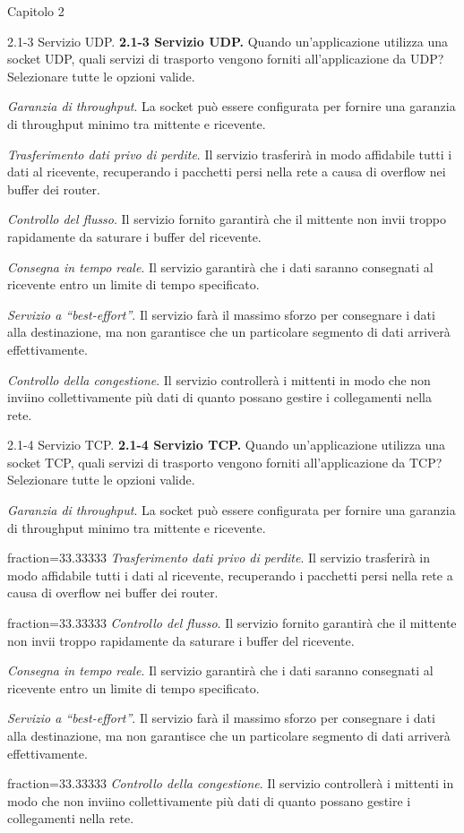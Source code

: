 \documentclass[11pt]{article}
\begin{document}
\begin{quiz}{Capitolo 2}
\begin{multi}[points=1,shuffle,multiple]{2.1-3 Servizio UDP.}
\textbf{2.1-3 Servizio UDP.} Quando un'applicazione utilizza una socket UDP, quali servizi di trasporto vengono forniti all'applicazione da UDP? Selezionare tutte le opzioni valide.
\item \emph{Garanzia di throughput}. La socket può essere configurata per fornire una garanzia di throughput minimo tra mittente e ricevente.
\item \emph{Trasferimento dati privo di perdite}. Il servizio trasferirà in modo affidabile tutti i dati al ricevente, recuperando i pacchetti persi nella rete a causa di overflow nei buffer dei router.
\item \emph{Controllo del flusso}. Il servizio fornito garantirà che il mittente non invii troppo rapidamente da saturare i buffer del ricevente.
\item \emph{Consegna in tempo reale}. Il servizio garantirà che i dati saranno consegnati al ricevente entro un limite di tempo specificato.
\item* \emph{Servizio a ``best-effort''}. Il servizio farà il massimo sforzo per consegnare i dati alla destinazione, ma non garantisce che un particolare segmento di dati arriverà effettivamente.
\item \emph{Controllo della congestione}. Il servizio controllerà i mittenti in modo che non inviino collettivamente più dati di quanto possano gestire i collegamenti nella rete.
\end{multi}

\begin{multi}[points=1,shuffle,multiple]{2.1-4 Servizio TCP.}
\textbf{2.1-4 Servizio TCP.} Quando un'applicazione utilizza una socket TCP, quali servizi di trasporto vengono forniti all'applicazione da TCP? Selezionare tutte le opzioni valide.
\item \emph{Garanzia di throughput}. La socket può essere configurata per fornire una garanzia di throughput minimo tra mittente e ricevente.
\item[fraction=33.33333] \emph{Trasferimento dati privo di perdite}. Il servizio trasferirà in modo affidabile tutti i dati al ricevente, recuperando i pacchetti persi nella rete a causa di overflow nei buffer dei router.
\item[fraction=33.33333] \emph{Controllo del flusso}. Il servizio fornito garantirà che il mittente non invii troppo rapidamente da saturare i buffer del ricevente.
\item \emph{Consegna in tempo reale}. Il servizio garantirà che i dati saranno consegnati al ricevente entro un limite di tempo specificato.
\item \emph{Servizio a ``best-effort''}. Il servizio farà il massimo sforzo per consegnare i dati alla destinazione, ma non garantisce che un particolare segmento di dati arriverà effettivamente.
\item[fraction=33.33333] \emph{Controllo della congestione}. Il servizio controllerà i mittenti in modo che non inviino collettivamente più dati di quanto possano gestire i collegamenti nella rete.
\end{multi}


\end{quiz}
\end{document}
